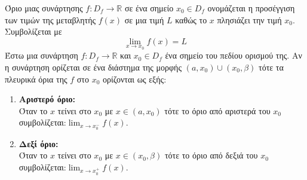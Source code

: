 \documentclass[twoside,nofonts,ektypwsh,math,spyros]{frontisthrio}
\begin{document}
\orismoi
{}
Όριο μιας συνάρτησης $ f:D_f\rightarrow\mathbb{R} $ σε ένα σημείο $ x_0\in D_f $ ονομάζεται η προσέγγιση των τιμών της μεταβλητής $ f(x) $ σε μια τιμή $ L $ καθώς το $ x $ πλησιάζει την τιμή $ x_0 $. Συμβολίζεται με \[ \lim_{x\rightarrow x_0}{f(x)}=L \]
Έστω μια συνάρτηση $ f:D_f\to \mathbb{R} $ και $ x_0\in D_f $ ένα σημείο του πεδίου ορισμού της. Αν η συνάρτηση ορίζεται σε ένα διάστημα της μορφής $ (a,x_0)\cup(x_0,\beta) $ τότε τα πλευρικά όρια της $ f $ στο $ x_0 $ ορίζονται ως εξής:
\begin{enumerate}
\item \textbf{Αριστερό όριο:}\\Όταν το $ x $ τείνει στο $ x_0 $ με $ x\in(a,x_0) $ τότε το όριο από αριστερά του $ x_0 $ συμβολίζεται:$ {\displaystyle\lim_{x\to x_0^-}{f(x)}} $.
\item \textbf{Δεξί όριο:}\\Όταν το $ x $ τείνει στο $ x_0 $ με $ x\in(x_0,\beta) $ τότε το όριο από δεξιά του $ x_0 $ συμβολίζεται:$ {\displaystyle\lim_{x\to x_0^+}{f(x)}} $.
\end{enumerate}
\end{document}
